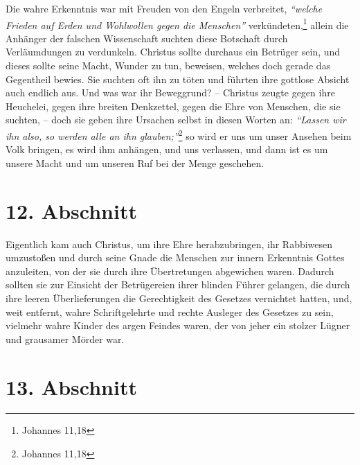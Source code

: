 Die wahre Erkenntnis war mit Freuden von den
Engeln verbreitet, \textit{"`welche Frieden auf Erden
und Wohlwollen gegen die Menschen"'}
verkündeten,\footnote{Johannes 11,18}
allein die Anhänger der falschen Wissenschaft
suchten diese Botschaft durch Verläumdungen zu verdunkeln. Christus sollte
durchaus ein Betrüger sein, und dieses sollte seine Macht, Wunder
zu tun,
beweisen, welches doch gerade das Gegentheil bewies. Sie suchten oft ihn zu
töten und führten ihre gottlose Absicht auch endlich aus. Und was war ihr
Beweggrund? -- Christus zeugte gegen ihre Heuchelei, gegen ihre
breiten
Denkzettel, gegen die Ehre von Menschen, die sie suchten, -- doch sie geben ihre
Ursachen selbst in diesen Worten an:
\textit{"`Lassen wir ihn also, so werden alle an ihn
glauben;"'}\footnote{Johannes 11,18}
so wird er uns um unser Ansehen beim Volk
bringen, es wird ihm anhängen, und uns verlassen, und dann ist es um unsere
Macht und um unseren Ruf bei der Menge geschehen.

\section{12. Abschnitt} \label{kap7_ab12}

Eigentlich kam auch Christus, um ihre Ehre herabzubringen, ihr Rabbiwesen
umzustoßen und durch seine Gnade die Menschen zur innern Erkenntnis Gottes
anzuleiten, von der sie durch ihre Übertretungen abgewichen waren. Dadurch
sollten sie zur Einsicht der Betrügereien ihrer blinden
Führer gelangen, die
durch ihre leeren Überlieferungen die Gerechtigkeit des
Gesetzes vernichtet
hatten, und, weit entfernt, wahre Schriftgelehrte und rechte Ausleger des
Gesetzes zu sein, vielmehr wahre Kinder des argen Feindes waren, der von jeher
ein stolzer Lügner und grausamer Mörder war.

\section{13. Abschnitt} \label{kap7_ab13}


